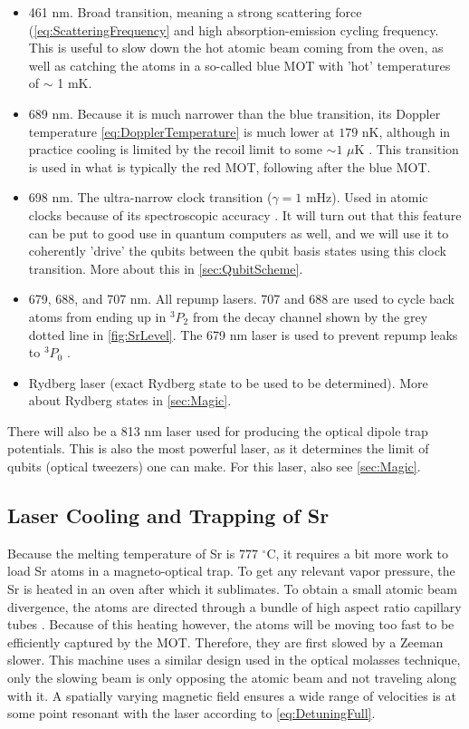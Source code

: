 \begin{itemize}
	\item 461 nm. Broad transition, meaning a strong scattering force (\cref{eq:ScatteringFrequency} and high absorption-emission cycling frequency.
	This is useful to slow down the hot atomic beam coming from the oven, as well as catching the atoms in a so-called blue \ac{MOT} with 'hot' temperatures of $\sim$ 1 mK.
	
	\item 689 nm. Because it is much narrower than the blue transition, its Doppler temperature \cref{eq:DopplerTemperature} is much lower at $179$ nK, although in practice cooling is limited by the recoil limit to some $\sim 1$ $\mu$K \cite{Stellmer2013,Boyd2007}.
	This transition is used in what is typically the red MOT, following after the blue MOT. 
	
	\item 698 nm. The ultra-narrow clock transition ($\gamma = 1$ mHz). 
	Used in atomic clocks because of its spectroscopic accuracy \cite{Bloom2014}.
	It will turn out that this feature can be put to good use in quantum computers as well, and we will use it to coherently 'drive' the qubits between the qubit basis states using this clock transition. 
	More about this in \cref{sec:QubitScheme}.
	
	\item 679, 688, and 707 nm. 
	All repump lasers. 707 and 688 are used to cycle back atoms from ending up in ${}^3P_2$ from the decay channel shown by the grey dotted line in \cref{fig:SrLevel}. The 679 nm laser is used to prevent repump leaks to ${}^3P_0$ \cite{Stellmer2013,Xu2003}.
	
	\item Rydberg laser (exact Rydberg state to be used to be determined). More about Rydberg states in \cref{sec:Magic}.
	
\end{itemize}
There will also be a 813 nm laser used for producing the optical dipole trap potentials.
This is also the most powerful laser, as it determines the limit of qubits (optical tweezers) one can make. 
For this laser, also see \cref{sec:Magic}.

\subsection{Laser Cooling and Trapping of Sr}

Because the melting temperature of Sr is $777$ ${}^{\circ}$C, it requires a bit more work to load Sr atoms in a magneto-optical trap.
To get any relevant vapor pressure, the Sr is heated in an oven after which it sublimates. 
To obtain a small atomic beam divergence, the atoms are directed through a bundle of high aspect ratio capillary tubes \cite{Stellmer2013}. Because of this heating however, the atoms will be moving too fast to be efficiently captured by the MOT.
Therefore, they are first slowed by a Zeeman slower. 
This machine uses a similar design used in the optical molasses technique, only the slowing beam is only opposing the atomic beam and not traveling along with it. 
A spatially varying magnetic field ensures a wide range of velocities is at some point resonant with the laser according to \cref{eq:DetuningFull}. 

